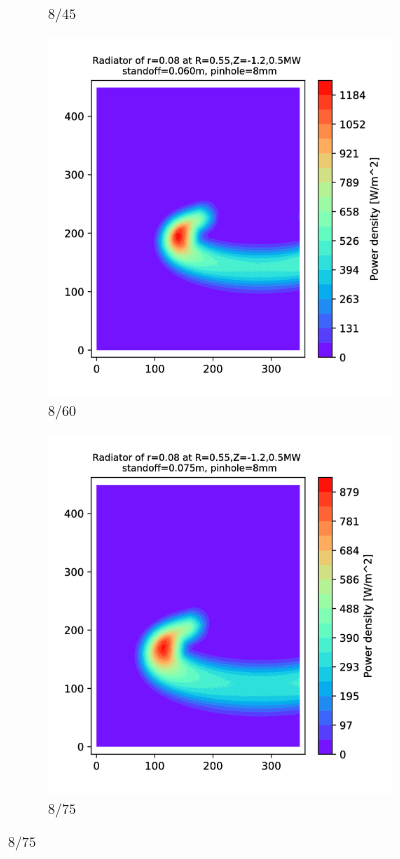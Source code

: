 \begin{figure}
\begin{subfigure}{0.3\textwidth}
         \caption{$8/45$}
         \label{fig:8_45}
     \end{subfigure}
     \hfill
     \begin{subfigure}{0.3\textwidth}
         \centering
         \includegraphics[trim={70 0 110 0},clip,width=\textwidth]{Chapters/chapter2/figs/8_60.png}
         \caption{$8/60$}
         \label{fig:8_60}
     \end{subfigure}
     \hfill
     \begin{subfigure}{0.325\textwidth}
         \centering
         \includegraphics[trim={70 0 0 0},clip,width=\textwidth]{Chapters/chapter2/figs/8_75.png}
         \caption{$8/75$}
         \label{fig:8_75}
     \end{subfigure}


\end{figure}
